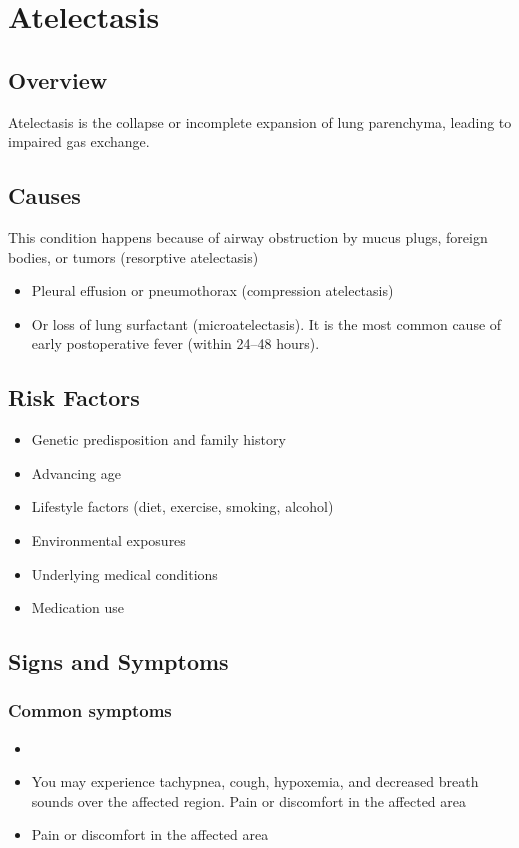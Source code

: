 \chapter{Atelectasis}
\label{sec:Atelectasis}

\section{Overview}
Atelectasis is the collapse or incomplete expansion of lung parenchyma, leading to impaired gas exchange.
\section{Causes}
This condition happens because of airway obstruction by mucus plugs, foreign bodies, or tumors (resorptive atelectasis)

\begin{itemize}[noitemsep]
  \item Pleural effusion or pneumothorax (compression atelectasis)
  \item Or loss of lung surfactant (microatelectasis). It is the most common cause of early postoperative fever (within 24--48 hours).
\end{itemize}
\section{Risk Factors}


\begin{itemize}[noitemsep]
  \item Genetic predisposition and family history
  \item Advancing age
  \item Lifestyle factors (diet, exercise, smoking, alcohol)
  \item Environmental exposures
  \item Underlying medical conditions
  \item Medication use
\end{itemize}
\section{Signs and Symptoms}

\subsection{Common symptoms}
\begin{itemize}[noitemsep]
  \item \item You may experience tachypnea, cough, hypoxemia, and decreased breath sounds over the affected region. Pain or discomfort in the affected area    \item Pain or discomfort in the affected area
  \end{itemize}

